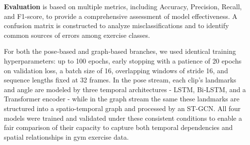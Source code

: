 \documentclass[journal,onecolumn, 11pt]{IEEEtran}
\begin{document}
\textbf{Evaluation} is based on multiple metrics, including Accuracy, Precision, Recall, and F1-score, to provide a comprehensive assessment of model effectiveness. A confusion matrix is constructed to analyze misclassifications and to identify common sources of errors among exercise classes.

For both the pose‐based and graph‐based branches, we used identical training hyperparameters: up to 100 epochs, early stopping with a patience of 20 epochs on validation loss, a batch size of 16, overlapping windows of stride 16, and sequence lengths fixed at 32 frames. In the pose stream, each clip’s landmarks and angle are modeled by three temporal architectures - LSTM, Bi‐LSTM, and a Transformer encoder - while in the graph stream the same these landmarks are structured into a spatio-temporal graph and processed by an ST-GCN. All four models were trained and validated under these consistent conditions to enable a fair comparison of their capacity to capture both temporal dependencies and spatial relationships in gym exercise data.


\end{document}
